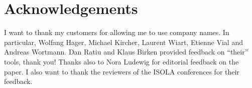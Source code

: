 \documentclass[runningheads]{llncs}
\begin{document}




 



\section*{Acknowledgements}

I want to thank my customers for allowing me to use company names. In particular, 
Wolfang Hager, Michael Kircher, Laurent Wiart, Etienne Vial and Andreas Wortmann.
Dan Ratiu and Klaus Birken provided feedback on ``their'' tools, thank you!
Thanks also to Nora Ludewig for editorial feedback on the paper. I also want to 
thank the reviewers of the ISOLA conferences for their feedback.




\end{document}
